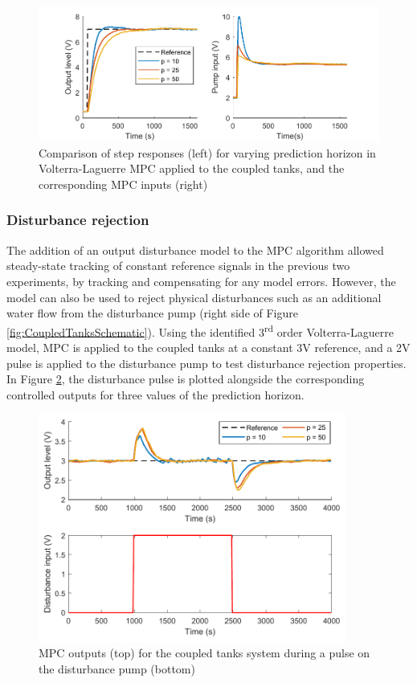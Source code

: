 \begin{figure}[h]
\centering
\includegraphics[width=1\textwidth]{Chapter11_ControlStudy/CoupledTanksStepResponse.pdf}
\caption{Comparison of step responses (left) for varying prediction horizon in Volterra-Laguerre MPC applied to the coupled tanks, and the corresponding MPC inputs (right)}
\label{fig:CoupledTanksStepResponse}
\end{figure}

\subsubsection{Disturbance rejection}

The addition of an output disturbance model to the MPC algorithm allowed steady-state tracking of constant reference signals in the previous two experiments, by tracking and compensating for any model errors. However, the model can also be used to reject physical disturbances such as an additional water flow from the disturbance pump (right side of Figure \ref{fig:CoupledTanksSchematic}). Using the identified 3\textsuperscript{rd} order Volterra-Laguerre model, MPC is applied to the coupled tanks at a constant 3V reference, and a 2V pulse is applied to the disturbance pump to test disturbance rejection properties. In Figure \ref{fig:CoupledTanksDisturbance}, the disturbance pulse is plotted alongside the corresponding controlled outputs for three values of the prediction horizon.

\begin{figure}[h]
\centering
\includegraphics[width=0.9\textwidth]{Chapter11_ControlStudy/CoupledTanksDisturbance.pdf}
\caption{MPC outputs (top) for the coupled tanks system during a pulse on the disturbance pump (bottom)}
\label{fig:CoupledTanksDisturbance}
\end{figure}

